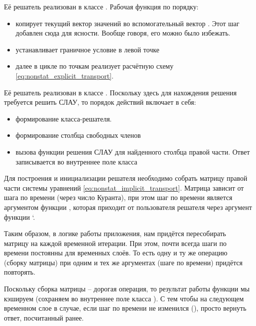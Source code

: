 

Её решатель реализован в классе . Рабочая функция по порядку:
\begin{itemize}
\item копирует текущий вектор значений во вспомогательный вектор .
      Этот шаг добавлен сюда для ясности. Вообще говоря, его можно было избежать.
\item устанавливает граничное условие в левой точке
\item далее в цикле по точкам реализует расчётную схему \eqref{eq:nonstat_explicit_transport}.
\end{itemize}


Её решатель реализован в классе .
Поскольку здесь для нахождения решения требуется решить СЛАУ, то
порядок действий включает в себя:
\begin{itemize}
\item формирование класса-решателя.
\item формирование столбца свободных членов
\item вызова функции решения СЛАУ для найденного столбца правой части. Ответ записывается
      во внутреннее поле класса 
\end{itemize}


Для построения и инициализации решателя необходимо
собрать матрицу правой части системы уравнений \eqref{eq:nonstat_implicit_transport}.
Матрица зависит от шага по времени (через число Куранта), при этом шаг по времени является
аргументом функции , которая приходит от пользователя решателя через аргумент функции `.

Таким образом, в логике работы приложения, нам придётся пересобирать матрицу на каждой временной итерации.
При этом, почти всегда шаги по времени постоянны для временных слоёв. То есть одну и ту же операцию (сборку матрицы)
при одним и тех же аргументах (шаге по времени) придётся повторять. 

Поскольку сборка матрицы -- дорогая операция, то результат работы
функции  мы кэшируем (сохраняем во внутреннее поле класса ).
С тем чтобы на следующем временном слое в случае, если шаг по времени не изменился (),
просто вернуть ответ, посчитанный ранее.

